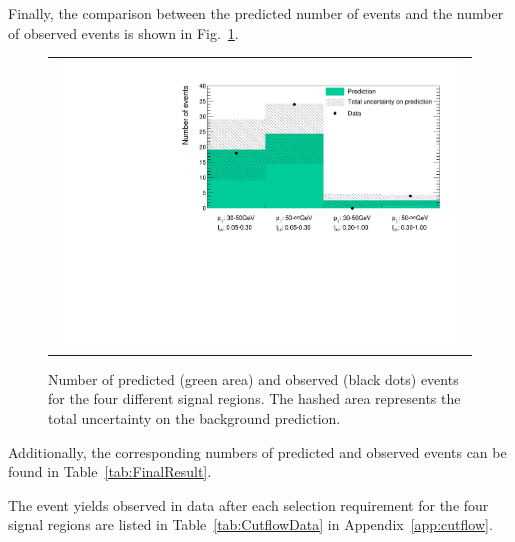 Finally, the comparison between the predicted number of events and the number of observed events is shown in Fig.~\ref{fig:FinalResult}.
\begin{figure}[!b]
  \centering 
  \vspace{55pt}
  \begin{tabular}{c}
    \includegraphics[width=0.99\textwidth]{figures/analysis/Results/FinalResultPlot.pdf} 
  \end{tabular}
  \caption{Number of predicted (green area) and observed (black dots) events for the four different signal regions. The hashed area represents the total uncertainty on the background prediction.}
  \label{fig:FinalResult}
\end{figure} 
Additionally, the corresponding numbers of predicted and observed events can be found in Table~\ref{tab:FinalResult}.
\renewcommand{\arraystretch}{1.5}
\begin{table}[!t]
\centering
\caption{Number of predicted and observed events for the four different signal regions.}
\label{tab:FinalResult}
\end{table}
The event yields observed in data after each selection requirement for the four signal regions are listed in Table~\ref{tab:CutflowData} in Appendix~\ref{app:cutflow}.

